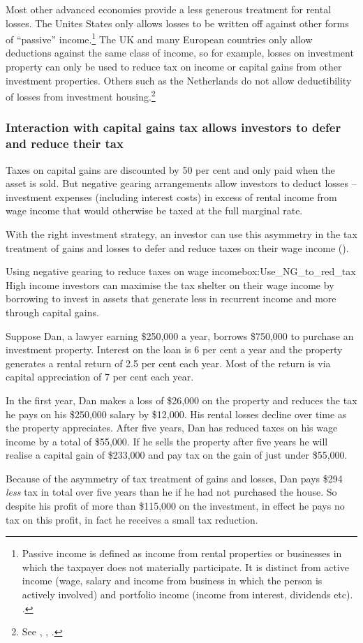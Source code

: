 \documentclass{grattan}\usepackage[]{graphicx}\usepackage[]{color}
\begin{document}
Most other advanced economies provide a less generous treatment for rental losses. The Unites States only allows losses to be written off against other forms of ``passive'' income.\footnote{Passive income is defined as income from rental properties or businesses in which the taxpayer does not materially participate. It is distinct from active income (wage, salary and income from business in which the person is actively involved) and portfolio income (income from interest, dividends etc). \textcite{IRS2015}.}  The UK and many European countries only allow deductions against the same class of income, so for example, losses on investment property can only be used to reduce tax on income or capital gains from other investment properties. Others such as the Netherlands do not allow deductibility of losses from investment housing.\footnote{See \textcite[p.~43]{RBA2014}, \textcite[p.~86]{Commission2004}, \textcite[pp.~92-95]{ODonnell2005}.}

\subsubsection{Interaction with capital gains tax allows investors to defer and reduce their tax}
Taxes on capital gains are discounted by 50 per cent and only paid when the asset is sold. But negative gearing arrangements allow investors to deduct losses -- investment expenses (including interest costs) in excess of rental income from wage income that would otherwise be taxed at the full marginal rate.

With the right investment strategy, an investor can use this asymmetry in the tax treatment of gains and losses to defer and reduce taxes on their wage income ().

\begin{smallbox}{Using negative gearing to reduce taxes on wage income}{box:Use_NG_to_red_tax}
High income investors can maximise the tax shelter on their wage income by borrowing to invest in assets that generate less in recurrent income and more through capital gains. 

Suppose Dan, a lawyer earning \$250,000 a year, borrows \$750,000 to purchase an investment property. Interest on the loan is 6 per cent a year and the property generates a rental return of 2.5 per cent each year.  Most of the return is via capital appreciation of 7 per cent each year.

In the first year, Dan makes a loss of \$26,000 on the property and reduces the tax he pays on his \$250,000 salary by \$12,000. His rental losses decline over time as the property appreciates. After five years, Dan has reduced taxes on his wage income by a total of \$55,000. If he sells the property after five years he will realise a capital gain of \$233,000 and pay tax on the gain of just under \$55,000. 

Because of the asymmetry of tax treatment of gains and losses, Dan pays \$294 \emph{less} tax in total over five years than he if he had not purchased the house. So despite his profit of more than \$115,000 on the investment, in effect he pays no tax on this profit, in fact he receives a small tax reduction.
\end{smallbox}
\end{document}
